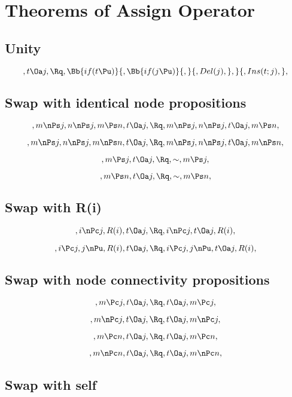 \chapter{Theorems of Assign Operator}

\section{ Unity}
\[, t \Oa j, \Rq , \Bb{if(t \Pu)}{,\Bb{if(j \Pu)}{,}{, Del(j),}, }{, Ins(t;j),},\]



\bigskip
\bigskip
\section{Swap with identical node propositions }
\[, m \nPs j, n \nPs j, m \Ps n, t \Oa j, \Rq , m \nPs j, n \nPs j, t \Oa j, m \Ps n,\]

\[, m \nPs j, n \nPs j, m \nPs n, t \Oa j, \Rq , m \nPs j, n \nPs j, t \Oa j, m \nPs n,\]

\[, m \Ps j, t \Oa j, \Rq ,\sim, m \Ps j,\]

\[, m \Ps n, t \Oa j, \Rq ,\sim, m \Ps n,\]


\bigskip
\bigskip
\section{Swap with R(i) }
\[, i \nPc j, R(i), t \Oa j, \Rq , i \nPc j, t \Oa j, R(i),\]

\[, i \Pc j, j \nPu, R(i), t \Oa j, \Rq , i \Pc j, j \nPu, t \Oa j, R(i),\]



\bigskip
\bigskip
\section{Swap with node connectivity propositions }
\[, m \Pc j, t \Oa j, \Rq , t \Oa j, m \Pc j, \]

\[, m \nPc j, t \Oa j, \Rq , t \Oa j, m \nPc j, \]

\[, m \Pc n, t \Oa j, \Rq , t \Oa j, m \Pc n, \]

\[, m \nPc n, t \Oa j, \Rq , t \Oa j, m \nPc n, \]



\bigskip
\bigskip
\section{Swap with self }
